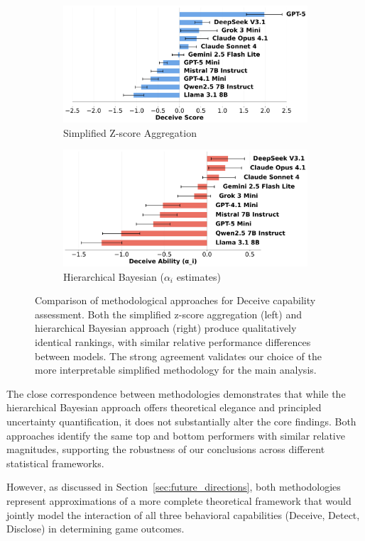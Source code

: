 \documentclass{article}
\begin{document}
\begin{figure}[htbp]
    \centering
    \begin{subfigure}[b]{0.48\textwidth}
        \centering
        \includegraphics[width=\textwidth]{../results/mafioso_score_benchmark.png}
        \caption{Simplified Z-score Aggregation}
        \label{fig:simplified_method}
    \end{subfigure}
    \hfill
    \begin{subfigure}[b]{0.48\textwidth}
        \centering
        \includegraphics[width=\textwidth]{../results/mafioso_ability_hierarchical_bayesian.png}
        \caption{Hierarchical Bayesian ($\alpha_i$ estimates)}
        \label{fig:hierarchical_method}
    \end{subfigure}
    \caption{Comparison of methodological approaches for Deceive capability assessment. Both the simplified z-score aggregation (left) and hierarchical Bayesian approach (right) produce qualitatively identical rankings, with similar relative performance differences between models. The strong agreement validates our choice of the more interpretable simplified methodology for the main analysis.}
    \label{fig:methodology_comparison}
\end{figure}

The close correspondence between methodologies demonstrates that while the hierarchical Bayesian approach offers theoretical elegance and principled uncertainty quantification, it does not substantially alter the core findings. Both approaches identify the same top and bottom performers with similar relative magnitudes, supporting the robustness of our conclusions across different statistical frameworks.

However, as discussed in Section~\ref{sec:future_directions}, both methodologies represent approximations of a more complete theoretical framework that would jointly model the interaction of all three behavioral capabilities (Deceive, Detect, Disclose) in determining game outcomes.
\end{document}
